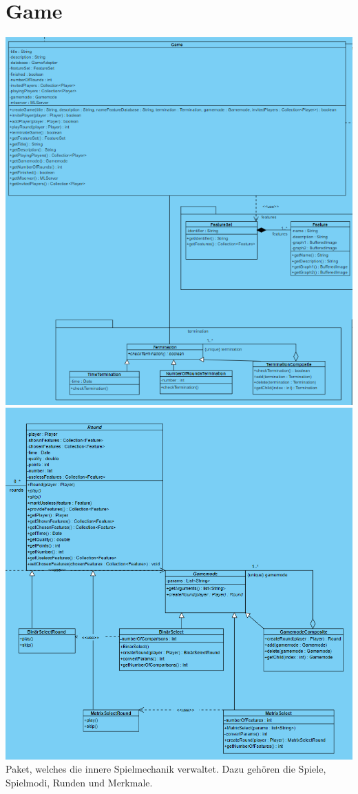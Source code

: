 \documentclass[a4paper]{scrreprt}
\begin{document}
	
	\section{Game}
	\includegraphics[width=\textwidth]{img/GameTerminationFeature.PNG}
	\includegraphics[width=\textwidth]{img/RoundAndGameMode.PNG}
	Paket, welches die innere Spielmechanik verwaltet. Dazu gehören die Spiele, Spielmodi, Runden und Merkmale.
	
\end{document}
